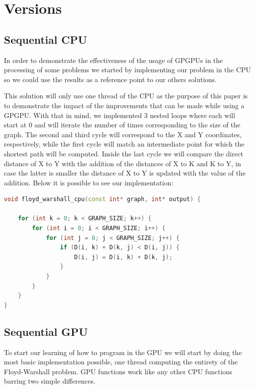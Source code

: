 \documentclass[conference]{IEEEtran}
\begin{document}
\section{Versions}
\subsection{Sequential CPU}
In order to demonstrate the effectiveness of the usage of GPGPUs in the processing 
of some problems we started by implementing our problem in the CPU so we could use the results as a reference point to our others solutions.

This solution will only use one thread of the CPU as the purpose of this paper is to demonstrate the impact of the improvements that can be made while using a GPGPU.
With that in mind, we implemented 3 nested loops where each will start at 0 and will iterate the number of times corresponding to the size of the graph.
The second and third cycle will correspond to the X and Y coordinates, respectively, 
while the first cycle will match an intermediate point for which the shortest path will be computed.
Inside the last cycle we will compare the direct distance of X to Y with the addition of the distances of X to K and K to Y, in case the latter is smaller the distance of X to Y is updated with the value of the addition.
Below it is possible to see our implementation:

\begin{lstlisting}[language=C++, caption=Sequential CPU]
void floyd_warshall_cpu(const int* graph, int* output) {
	
	for (int k = 0; k < GRAPH_SIZE; k++) {
		for (int i = 0; i < GRAPH_SIZE; i++) {
			for (int j = 0; j < GRAPH_SIZE; j++) {
				if (D(i, k) + D(k, j) < D(i, j)) {
					D(i, j) = D(i, k) + D(k, j);
				}
			}
		}
	}
}
\end{lstlisting}

\subsection{Sequential GPU}
To start our learning of how to program in the GPU we will start by doing the most basic implementation possible, one thread computing the entirety of the Floyd-Warshall problem.
GPU functions work like any other CPU functions barring two simple differences. 
\end{document}
